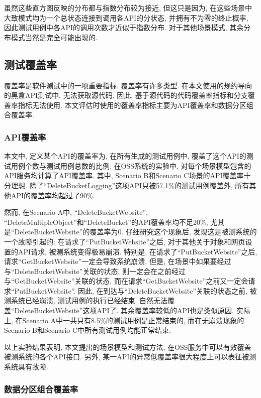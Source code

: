             虽然这些直方图反映的分布都与指数分布较为接近, 但这只是因为, 在这些场景中大致模式均为一个总状态连接到调用各API的分状态, 并拥有不为零的终止概率, 因此测试用例中各API的调用次数才近似于指数分布. 对于其他场景模式, 其余分布模式当然是完全可能出现的.

        \subsection{测试覆盖率}
            覆盖率是软件测试中的一项重要指标. 覆盖率有许多类型. 在本文使用的规约导向的黑盒API测试中, 无法获取源代码. 因此, 基于源代码的代码覆盖率指标和分支覆盖率指标无法使用. 本文评估时使用的覆盖率指标主要为API覆盖率和数据分区组合覆盖率.
            
            \subsubsection*{API覆盖率}
            
                本文中, 定义某个API的覆盖率为, 在所有生成的测试用例中, 覆盖了这个API的测试用例个数与测试用例总数的比例. 在OSS系统的实验中, 对每个场景模型包含的API服务均计算了API覆盖率. 其中, Scenario B和Scenario C场景的API覆盖率十分理想. 除了“DeleteBucketLogging”这项API只被57.1\%的测试用例覆盖外, 所有其他API的覆盖率均超过了90\%.
                
                然而, 在Scenario A中, “DeleteBucketWebsite”, “DeleteMultipleObject”和“DeleteBucket”的API覆盖率均不足20\%, 尤其是“DeleteBucketWebsite”的覆盖率为0. 仔细研究这个现象后, 发现这是被测系统的一个故障引起的: 在请求了“PutBucketWebsite”之后, 对于其他关于对象和网页设置的API请求, 被测系统变得极易崩溃. 特别是, 在请求了“PutBucketWebsite”之后, 请求“GetBucketWebsite”一定会导致系统崩溃. 但是, 在场景中如果要经过与“DeleteBucketWebsite”关联的状态, 则一定会在之前经过与“GetBucketWebsite”关联的状态, 而在请求“GetBucketWebsite”之前又一定会请求“PutBucketWebsite”. 因此, 在到达与“DeleteBucketWebsite”关联的状态之前, 被测系统已经崩溃, 测试用例的执行已经结束. 自然无法覆盖“DeleteBucketWebsite”这项API了. 其余覆盖率较低的API也是类似原因. 实际上, 在Scenario A中一共只有8.5\%的测试用例是正常结束的, 而在无崩溃现象的Scenario B和Scenario C中所有测试用例均能正常结束.
                
                以上实验结果表明, 本文提出的场景模型和测试方法, 在OSS服务中可以有效覆盖被测系统的各个API接口. 另外, 某一API的异常低覆盖率很大程度上可以表征被测系统具有故障.
            
            \subsubsection*{数据分区组合覆盖率}
            
